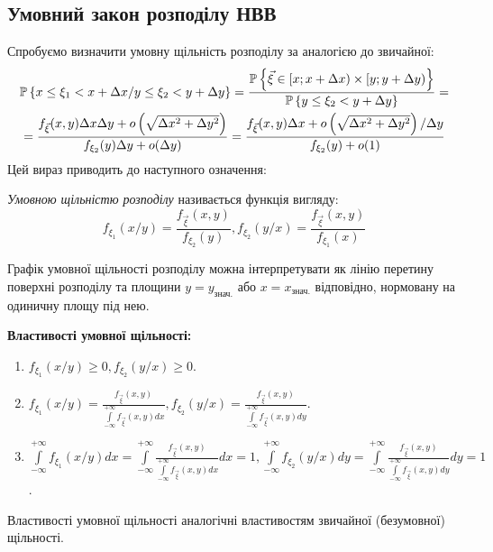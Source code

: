 \subsection{Умовний закон розподілу НВВ}
Спробуємо визначити умовну щільність розподілу за аналогією до звичайної:
\begin{gather*}
    \P\left\{x \leq \xi_1 < x + \Delta x / y \leq \xi_2 < y + \Delta y\right\} = 
    \frac{
        \P\left\{\vec{\xi} \in \left[x; x+\Delta x\right) \times \left[y; y+\Delta y\right)\right\}
    }{
        \P\left\{y \leq \xi_2 < y + \Delta y \right\}
    }
    = \\ =
    \frac{f_{\vec{\xi}}(x,y)\Delta x \Delta y + 
    o\left(\sqrt{\Delta x^2 + \Delta y^2}\right)}{f_{\xi_2}(y)\Delta y + o(\Delta y)} = 
    \frac{f_{\vec{\xi}}(x,y)\Delta x  + 
    o\left(\sqrt{\Delta x^2 + \Delta y^2}\right)/\Delta y}{f_{\xi_2}(y) + o(1)}
\end{gather*}
Цей вираз приводить до наступного означення:
\begin{definition}
    \emph{Умовною щільністю розподілу} називається функція 
    вигляду:
    \begin{equation}
        f_{\xi_1}(x/y) = \frac{f_{\vec{\xi}}(x, y)}{f_{\xi_2}(y)}, f_{\xi_2}(y/x) = \frac{f_{\vec{\xi}}(x, y)}{f_{\xi_1}(x)}
    \end{equation}
\end{definition}

\begin{remark}
    Графік умовної щільності розподілу можна інтерпретувати як лінію перетину 
    поверхні розподілу та площини $y = y_{\text{знач.}}$ або
    $x = x_{\text{знач.}}$ відповідно, нормовану на одиничну площу під нею.
\end{remark}

\noindent \textbf{Властивості умовної щільності:}
\begin{enumerate}
    \item $f_{\xi_1}(x / y) \geq 0, f_{\xi_2}(y / x) \geq 0$.
    \item $f_{\xi_1}(x/y) = \frac{f_{\vec{\xi}}(x,y)}
    {\int\limits_{-\infty}^{+\infty}f_{\vec{\xi}}(x,y)dx},
    f_{\xi_2}(y/x) = \frac{f_{\vec{\xi}}(x,y)}
    {\int\limits_{-\infty}^{+\infty}f_{\vec{\xi}}(x,y)dy}$.
    \item $\int\limits_{-\infty}^{+\infty} f_{\xi_1}(x / y) dx = 
    \int\limits_{-\infty}^{+\infty}\frac{f_{\vec{\xi}}(x,y)}
    {\int\limits_{-\infty}^{+\infty}f_{\vec{\xi}}(x,y)dx}dx = 1,
    \int\limits_{-\infty}^{+\infty} f_{\xi_2}(y / x) dy = 
    \int\limits_{-\infty}^{+\infty}\frac{f_{\vec{\xi}}(x,y)}
    {\int\limits_{-\infty}^{+\infty}f_{\vec{\xi}}(x,y)dy}dy = 1$.
\end{enumerate}
Властивості умовної щільності аналогічні властивостям звичайної (безумовної) щільності.

